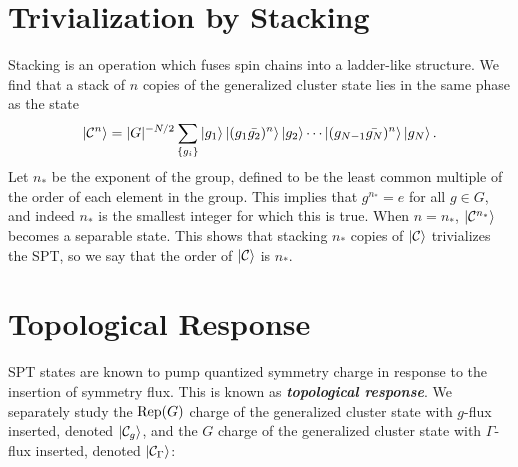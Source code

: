 \section{Trivialization by Stacking}
Stacking is an operation which fuses spin chains into a ladder-like structure. We find that a stack of $n$ copies of the generalized cluster state lies in the same phase as the state 
\begin{equation*}
    \ket{\mathcal{C}^n}=|G|^{-N/2}\sum_{\{g_i\}}\ket{g_1}\ket{(g_1\bar{g_2})^n}\ket{g_2}\cdots\ket{(g_{N-1}\bar{g_N})^n}\ket{g_N}.
\end{equation*}
Let $n_*$ be the exponent of the group, defined to be the least common multiple of the order of each element in the group. This implies that $g^{n_*}=e$ for all $g\in G$, and indeed $n_*$ is the smallest integer for which this is true. When $n=n_*$,  $\ket{\mathcal{C}^{n_*}}$ becomes a separable state. This shows that stacking $n_*$ copies of $\ket{\mathcal{C}}$ trivializes the SPT, so we say that the order of $\ket{\mathcal{C}}$ is $n_*$.


\section{Topological Response}
SPT states are known to pump quantized symmetry charge in response to the insertion of symmetry flux. This is known as \textbf{\textit{topological response}}. We separately study the $\text{Rep}(G)$ charge of the generalized cluster state with $g$-flux inserted, denoted $\ket{\mathcal{C}_g}$, and the $G$ charge of the generalized cluster state with $\Gamma$-flux inserted, denoted $\ket{\mathcal{C}_\Gamma}$:

